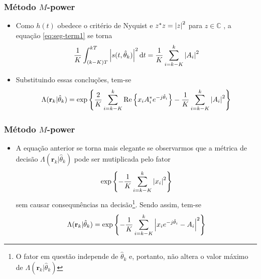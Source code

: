 \begin{frame}[t]
	\frametitle{Método \(M\)-power}
	\begin{itemize}
		\item Como \(h\left( t \right)\) obedece o critério de Nyquist e \(z^*z = \left\lvert z\right\rvert^2\) para \(z \in \mathbb{C}\) , a equação \eqref{eq:seg-term1} se torna
		\begin{align}
            \frac{1}{K} \int_{(k-K)T}^{kT} \abs{s(t, \hat{\theta}_{k})}^{2} \diff{t} = \frac{1}{K} \sum_{i = k-K}^{k} \abs{A_i}^2
        \end{align}
        \item Substituindo essas concluções, tem-se
        \begin{align}
            \Lambda(\mathbf{r}_k|\hat{\theta}_{k}) = \textnormal{exp}\left\{ \frac{2}{K} \sum_{i = k-K}^{k} \textnormal{Re} \left\{ x_i A_i^* e^{-j \hat{\theta}_{i}} \right\} - \frac{1}{K} \sum_{i = k-K}^{k} \left\lvert A_i\right\rvert^2 \right\}
        \end{align}
	\end{itemize}
	
\end{frame}

\begin{frame}[t]
    \frametitle{Método \(M\)-power}

    \begin{itemize}
        \item A equação anterior se torna mais elegante se observarmos que a métrica de decisão \(\Lambda(\mathbf{r}_k|\hat{\theta}_{k})\) pode ser mutiplicada pelo fator
        \begin{align}
            \textnormal{exp}\left\{ - \frac{1}{K} \sum_{i = k-K}^{k} \left\lvert x_i\right\rvert^2 \right\}
        \end{align}
        sem causar consequnências na decisão\footnote{O fator em questão independe de \(\hat{\theta}_{k}\) e, portanto, não altera o valor máximo de \(\Lambda(\mathbf{r}_k|\hat{\theta}_{k})\)}. Sendo assim, tem-se
        \begin{align}
            \Lambda(\mathbf{r}_k|\hat{\theta}_{k}) = \textnormal{exp}\left\{ - \frac{1}{K} \sum_{i = k-K}^{k} \left\lvert x_i e^{-j \hat{\theta}_i} - A_i\right\rvert^2 \right\}
        \end{align}
    \end{itemize}

\end{frame}

